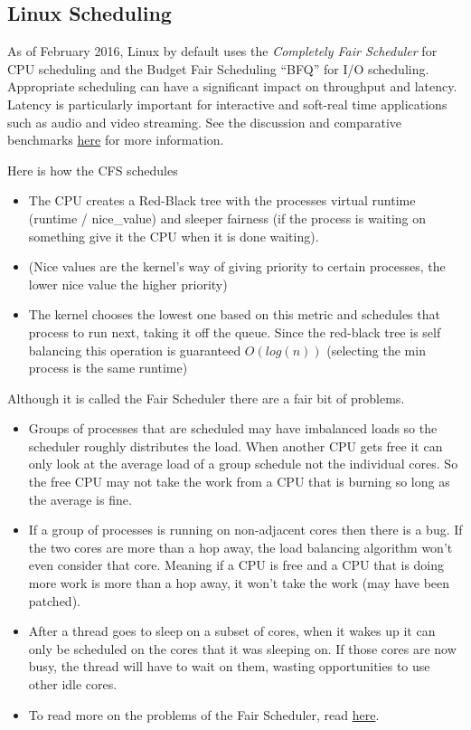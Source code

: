 \subsection{Linux Scheduling}\label{linux-scheduling}

As of February 2016, Linux by default uses the \emph{Completely Fair
Scheduler} for CPU scheduling and the Budget Fair Scheduling ``BFQ'' for
I/O scheduling. Appropriate scheduling can have a significant impact on
throughput and latency. Latency is particularly important for
interactive and soft-real time applications such as audio and video
streaming. See the discussion and comparative benchmarks
\href{https://lkml.org/lkml/2014/5/27/314}{here} for more information.

Here is how the CFS schedules

\begin{itemize}
\tightlist
\item
  The CPU creates a Red-Black tree with the processes virtual runtime
  (runtime / nice\_value) and sleeper fairness (if the process is
  waiting on something give it the CPU when it is done waiting).
\item
  (Nice values are the kernel's way of giving priority to certain
  processes, the lower nice value the higher priority)
\item
  The kernel chooses the lowest one based on this metric and schedules
  that process to run next, taking it off the queue. Since the red-black
  tree is self balancing this operation is guaranteed \(O(log(n))\)
  (selecting the min process is the same runtime)
\end{itemize}

Although it is called the Fair Scheduler there are a fair bit of
problems.

\begin{itemize}
\tightlist
\item
  Groups of processes that are scheduled may have imbalanced loads so
  the scheduler roughly distributes the load. When another CPU gets free
  it can only look at the average load of a group schedule not the
  individual cores. So the free CPU may not take the work from a CPU
  that is burning so long as the average is fine.
\item
  If a group of processes is running on non-adjacent cores then there is
  a bug. If the two cores are more than a hop away, the load balancing
  algorithm won't even consider that core. Meaning if a CPU is free and
  a CPU that is doing more work is more than a hop away, it won't take
  the work (may have been patched).
\item
  After a thread goes to sleep on a subset of cores, when it wakes up it
  can only be scheduled on the cores that it was sleeping on. If those
  cores are now busy, the thread will have to wait on them, wasting
  opportunities to use other idle cores.
\item
  To read more on the problems of the Fair Scheduler, read
  \href{https://blog.acolyer.org/2016/04/26/the-linux-scheduler-a-decade-of-wasted-cores}{here}.
\end{itemize}

